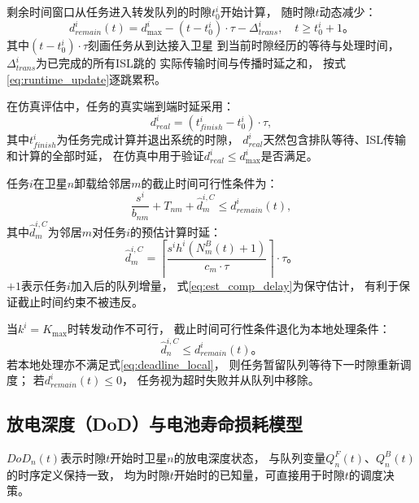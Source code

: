 \documentclass[a4paper,11pt]{article}
\begin{document}
剩余时间窗口从任务进入转发队列的时隙$t^i_0$开始计算，
随时隙$t$动态减少：
\begin{equation}
    d^i_{remain}(t) = d^i_{\max}
    - (t - t^i_0)\cdot\tau
    - \Delta^i_{trans},
    \quad t \geq t^i_0 + 1。
    \label{eq:d_remain}
\end{equation}
其中$(t - t^i_0)\cdot\tau$刻画任务从到达接入卫星
到当前时隙经历的等待与处理时间，
$\Delta^i_{trans}$为已完成的所有ISL跳的
实际传输时间与传播时延之和，
按式\eqref{eq:runtime_update}逐跳累积。

在仿真评估中，任务的真实端到端时延采用：
\begin{equation}
    d^i_{real} = (t^i_{finish} - t^i_0)\cdot\tau,
    \label{eq:d_real}
\end{equation}
其中$t^i_{finish}$为任务完成计算并退出系统的时隙，
$d^i_{real}$天然包含排队等待、ISL传输和计算的全部时延，
在仿真中用于验证$d^i_{real} \leq d^i_{\max}$是否满足。

任务$i$在卫星$n$卸载给邻居$m$的截止时间可行性条件为：
\begin{equation}
    \frac{s^i}{b_{nm}} + T_{nm}
    + \hat{d}^{i,C}_m \leq d^i_{remain}(t),
    \label{eq:deadline}
\end{equation}
其中$\hat{d}^{i,C}_m$为邻居$m$对任务$i$的预估计算时延：
\begin{equation}
    \hat{d}^{i,C}_m = \left\lceil
    \frac{s^i h^i (N^B_m(t) + 1)}{c_m \cdot \tau}
    \right\rceil \cdot \tau。
    \label{eq:est_comp_delay}
\end{equation}
$+1$表示任务$i$加入后的队列增量，
式\eqref{eq:est_comp_delay}为保守估计，
有利于保证截止时间约束不被违反。

当$k^i = K_{\max}$时转发动作不可行，
截止时间可行性条件退化为本地处理条件：
\begin{equation}
    \hat{d}^{i,C}_n \leq d^i_{remain}(t)。
    \label{eq:deadline_local}
\end{equation}
若本地处理亦不满足式\eqref{eq:deadline_local}，
则任务暂留队列等待下一时隙重新调度；
若$d^i_{remain}(t) \leq 0$，
任务视为超时失败并从队列中移除。

\subsection{放电深度（DoD）与电池寿命损耗模型}

$DoD_n(t)$表示时隙$t$开始时卫星$n$的放电深度状态，
与队列变量$Q^F_n(t)$、$Q^B_n(t)$的时序定义保持一致，
均为时隙$t$开始时的已知量，可直接用于时隙$t$的调度决策。
\end{document}
